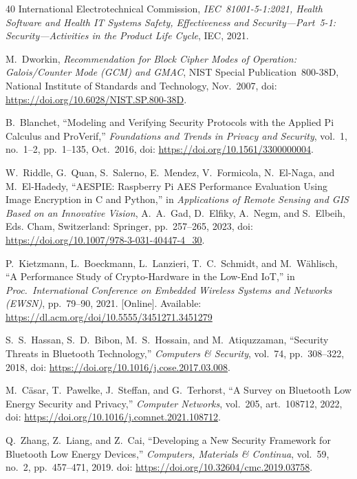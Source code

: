 \documentclass[journal]{IEEEtran}
\begin{document}
\begin{thebibliography}{40}
International Electrotechnical Commission, \emph{IEC~81001-5-1:2021, Health Software and Health IT Systems Safety, Effectiveness and Security---Part~5-1: Security---Activities in the Product Life Cycle}, IEC, 2021.

M.~Dworkin, \emph{Recommendation for Block Cipher Modes of Operation: Galois/Counter Mode (GCM) and GMAC}, NIST Special Publication~800-38D, National Institute of Standards and Technology, Nov.~2007, doi: \url{https://doi.org/10.6028/NIST.SP.800-38D}.

B.~Blanchet, ``Modeling and Verifying Security Protocols with the Applied Pi Calculus and ProVerif,'' \emph{Foundations and Trends in Privacy and Security}, vol.~1, no.~1--2, pp.~1--135, Oct.~2016, doi: \url{https://doi.org/10.1561/3300000004}.

W.~Riddle, G.~Quan, S.~Salerno, E.~Mendez, V.~Formicola, N.~El-Naga, and M.~El-Hadedy, ``AESPIE: Raspberry Pi AES Performance Evaluation Using Image Encryption in C and Python,'' in \emph{Applications of Remote Sensing and GIS Based on an Innovative Vision}, A.~A.~Gad, D.~Elfiky, A.~Negm, and S.~Elbeih, Eds. Cham, Switzerland: Springer, pp.~257--265, 2023, doi: \url{https://doi.org/10.1007/978-3-031-40447-4_30}.

P.~Kietzmann, L.~Boeckmann, L.~Lanzieri, T.~C.~Schmidt, and M.~W{\"a}hlisch, ``A Performance Study of Crypto-Hardware in the Low-End IoT,'' in \emph{Proc.\ International Conference on Embedded Wireless Systems and Networks (EWSN)}, pp.~79--90, 2021. [Online]. Available: \url{https://dl.acm.org/doi/10.5555/3451271.3451279}


S.~S.~Hassan, S.~D.~Bibon, M.~S.~Hossain, and M.~Atiquzzaman, ``Security Threats in Bluetooth Technology,'' \emph{Computers \& Security}, vol.~74, pp.~308--322, 2018, doi: \url{https://doi.org/10.1016/j.cose.2017.03.008}.

M.~C{\"a}sar, T.~Pawelke, J.~Steffan, and G.~Terhorst, ``A Survey on Bluetooth Low Energy Security and Privacy,'' \emph{Computer Networks}, vol.~205, art.~108712, 2022, doi: \url{https://doi.org/10.1016/j.comnet.2021.108712}.


Q.~Zhang, Z.~Liang, and Z.~Cai, ``Developing a New Security Framework for Bluetooth Low Energy Devices,'' \emph{Computers, Materials \& Continua}, vol.~59, no.~2, pp.~457--471, 2019. doi: \url{https://doi.org/10.32604/cmc.2019.03758}.


\end{thebibliography}
\end{document}
